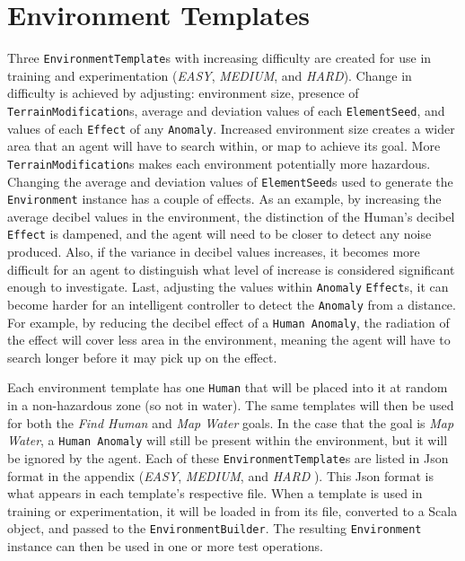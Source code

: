 \section{Environment Templates} \label{sec:test_environment_templates}
Three \texttt{EnvironmentTemplate}s with increasing difficulty are created for use in training and experimentation (\textit{EASY}, \textit{MEDIUM}, and \textit{HARD}).
Change in difficulty is achieved by adjusting: environment size, presence of \texttt{TerrainModification}s, average and deviation values of each \texttt{ElementSeed}, and values of each \texttt{Effect} of any \texttt{Anomaly}.
Increased environment size creates a wider area that an agent will have to search within, or map to achieve its goal.
More \texttt{TerrainModification}s makes each environment potentially more hazardous.
Changing the average and deviation values of \texttt{ElementSeed}s used to generate the \texttt{Environment} instance has a couple of effects.
As an example, by increasing the average decibel values in the environment, the distinction of the Human's decibel \texttt{Effect} is dampened, and the agent will need to be closer to detect any noise produced.
Also, if the variance in decibel values increases, it becomes more difficult for an agent to distinguish what level of increase is considered significant enough to investigate.
Last, adjusting the values within \texttt{Anomaly} \texttt{Effect}s, it can become harder for an intelligent controller to detect the \texttt{Anomaly} from a distance.
For example, by reducing the decibel effect of a \texttt{Human Anomaly}, the radiation of the effect will cover less area in the environment, meaning the agent will have to search longer before it may pick up on the effect.

Each environment template has one \texttt{Human} that will be placed into it at random in a non-hazardous zone (so not in water).
The same templates will then be used for both the \textit{Find Human} and \textit{Map Water} goals.
In the case that the goal is \textit{Map Water}, a \texttt{Human Anomaly} will still be present within the environment, but it will be ignored by the agent.
Each of these \texttt{EnvironmentTemplate}s are listed in Json format in the appendix (\textit{EASY}, \textit{MEDIUM}, and \textit{HARD} ).
This Json format is what appears in each template's respective file.
When a template is used in training or experimentation, it will be loaded in from its file, converted to a Scala object, and passed to the \texttt{EnvironmentBuilder}.
The resulting \texttt{Environment} instance can then be used in one or more test operations.


